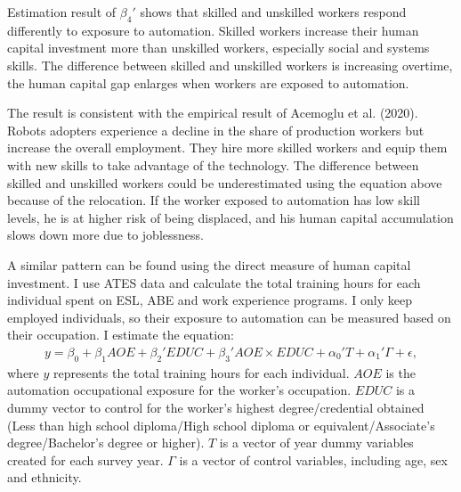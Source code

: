 \documentclass[12pt]{article}
\begin{document}
Estimation result of $\beta_4'$ shows that skilled and unskilled workers respond differently to exposure to automation. Skilled workers increase their human capital investment more than unskilled workers, especially social and systems skills. The difference between skilled and unskilled workers is increasing overtime, the human capital gap enlarges when workers are exposed to automation. 

The result is consistent with the empirical result of Acemoglu et al. (2020)\nocite{Acemogluetal2020}. Robots adopters experience a decline in the share of production workers but increase the overall employment. They hire more skilled workers and equip them with new skills to take advantage of the technology.  The difference between skilled and unskilled workers could be underestimated using the equation above because of the relocation. If the worker exposed to automation has low skill levels, he is at higher risk of being displaced, and his human capital accumulation slows down more due to joblessness. 

A similar pattern can be found using the direct measure of human capital investment. I use ATES data and calculate the total training hours for each individual spent on ESL, ABE and work experience programs. I only keep employed individuals, so their exposure to automation can be measured based on their occupation. I estimate the equation: 
\begin{align}
y = \beta_0 + \beta_1 AOE + \beta_2' EDUC +\beta_3' AOE \times EDUC + \alpha_0' T  +\alpha_1' \Gamma + \epsilon,
\end{align}
where $y$ represents the total training hours for each individual. $AOE$ is the automation occupational exposure for the worker's occupation. $EDUC$ is a dummy vector to control for the worker's highest degree/credential obtained (Less than high school diploma/High school diploma or equivalent/Associate's degree/Bachelor's degree or higher). $T$ is a vector of year dummy variables created for each survey year. $\Gamma$ is a vector of control variables, including age, sex and ethnicity. 
\end{document}

